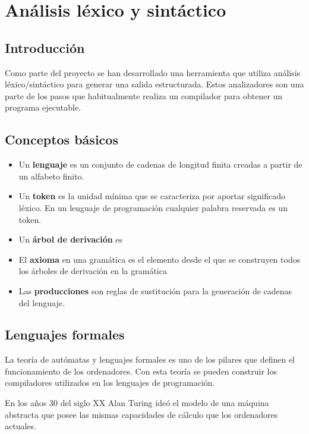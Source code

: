 \section{Análisis léxico y sintáctico}

\subsection{Introducción}

Como parte del proyecto se han desarrollado una herramienta que utiliza análisis léxico/sintáctico para generar una salida estructurada. Estos analizadores son una parte de los pasos que habitualmente realiza un compilador para obtener un programa ejecutable.

\subsection{Conceptos básicos}

\begin{itemize}
    \item Un \textbf{lenguaje} es un conjunto de cadenas de longitud finita creadas a partir de un alfabeto finito.
    \item Un \textbf{token} es la unidad mínima que se caracteriza por aportar significado léxico. En un lenguaje de programación cualquier palabra reservada es un token.
    \item Un \textbf{árbol de derivación} es
    \item El \textbf{axioma} en una gramática es el elemento desde el que se construyen todos los árboles de derivación en la gramática
    \item Las \textbf{producciones} son reglas de sustitución para la generación de cadenas del lenguaje.
\end{itemize}

\subsection{Lenguajes formales}

La teoría de autómatas y lenguajes formales es uno de los pilares que definen el funcionamiento de los ordenadores. Con esta teoría se pueden construir los compiladores utilizados en los lenguajes de programación.

En los años 30 del siglo XX Alan Turing ideó el modelo de una máquina abstracta que posee las mismas capacidades de cálculo que los ordenadores actuales. 

